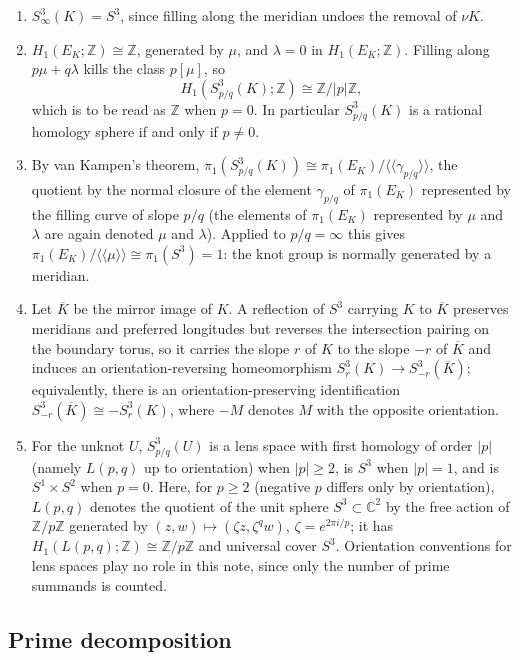 \documentclass[12pt]{article}
\newcommand{\Z}{\mathbb Z}
\newcommand{\Surg}[2]{S^3_{#1}(#2)}
\newcommand{\nbd}{\nu}
\theoremstyle{definition}
\theoremstyle{remark}
\begin{document}
\begin{enumerate}
\item[(S1)] \(\Surg{\infty}{K}=S^3\), since filling along the meridian
undoes the removal of \(\nbd K\).
\item[(S2)] \(H_1(E_K;\Z)\cong\Z\), generated by \(\mu\), and \(\lambda=0\)
in \(H_1(E_K;\Z)\). Filling along \(p\mu+q\lambda\) kills the class
\(p[\mu]\), so
\[
 H_1(\Surg{p/q}{K};\Z)\cong\Z/|p|\Z,
\]
which is to be read as \(\Z\) when \(p=0\). In particular
\(\Surg{p/q}{K}\) is a rational homology sphere if and only if \(p\neq0\).
\item[(S3)] By van Kampen's theorem,
\(\pi_1(\Surg{p/q}{K})\cong\pi_1(E_K)/\langle\!\langle\gamma_{p/q}\rangle\!\rangle\),
the quotient by the normal closure of the element \(\gamma_{p/q}\) of
\(\pi_1(E_K)\) represented by the filling curve of slope \(p/q\) (the
elements of \(\pi_1(E_K)\) represented by \(\mu\) and \(\lambda\) are
again denoted \(\mu\) and \(\lambda\)). Applied to \(p/q=\infty\) this
gives
\(\pi_1(E_K)/\langle\!\langle\mu\rangle\!\rangle\cong\pi_1(S^3)=1\): the
knot group is normally generated by a meridian.
\item[(S4)] Let \(\overline K\) be the mirror image of \(K\). A reflection
of \(S^3\) carrying \(K\) to \(\overline K\) preserves meridians and
preferred longitudes but reverses the intersection pairing on the
boundary torus, so it carries the slope \(r\) of \(K\) to the slope
\(-r\) of \(\overline K\) and induces an orientation-reversing
homeomorphism \(\Surg{r}{K}\to\Surg{-r}{\overline K}\); equivalently,
there is an orientation-preserving identification
\(\Surg{-r}{\overline K}\cong-\Surg{r}{K}\), where \(-M\) denotes \(M\)
with the opposite orientation.
\item[(S5)] For the unknot \(U\), \(\Surg{p/q}{U}\) is a lens space
with first homology of order \(|p|\) (namely \(L(p,q)\) up to
orientation) when \(|p|\geq2\), is \(S^3\) when \(|p|=1\), and is
\(S^1\times S^2\) when \(p=0\). Here, for \(p\geq2\) (negative \(p\)
differs only by orientation), \(L(p,q)\) denotes the quotient of the
unit sphere \(S^3\subset\mathbb C^2\) by the free action of \(\Z/p\Z\)
generated by \((z,w)\mapsto(\zeta z,\zeta^{q}w)\), \(\zeta=e^{2\pi i/p}\);
it has \(H_1(L(p,q);\Z)\cong\Z/p\Z\) and universal cover \(S^3\).
Orientation conventions for lens spaces play no role in this note, since
only the number of prime summands is counted.
\end{enumerate}

\subsection{Prime decomposition}\label{sec:prime}
\end{document}
